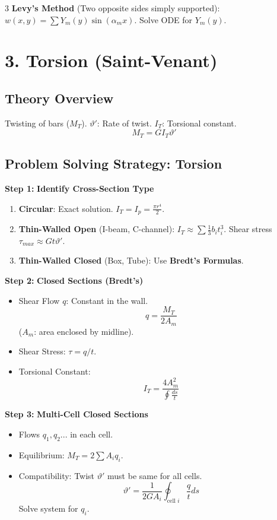 \documentclass[8pt]{extarticle}
\newcommand{\step}[1]{\textbf{\scriptsize Step #1:}}
\begin{document}
\begin{multicols*}{3}
\textbf{Levy's Method} (Two opposite sides simply supported):
$w(x,y) = \sum Y_m(y) \sin(\alpha_m x)$.
Solve ODE for $Y_m(y)$.

\section{3. Torsion (Saint-Venant)}
\subsection{Theory Overview}
Twisting of bars ($M_T$).
$\vartheta'$: Rate of twist. $I_T$: Torsional constant.
\[ M_T = G I_T \vartheta' \]

\subsection{Problem Solving Strategy: Torsion}

\step{1} \textbf{Identify Cross-Section Type}
\begin{enumerate}
    \item \textbf{Circular}: Exact solution. $I_T = I_p = \frac{\pi r^4}{2}$.
    \item \textbf{Thin-Walled Open} (I-beam, C-channel):
    $I_T \approx \sum \frac{1}{3} b_i t_i^3$.
    Shear stress $\tau_{max} \approx G t \vartheta'$.
    \item \textbf{Thin-Walled Closed} (Box, Tube):
    Use \textbf{Bredt's Formulas}.
\end{enumerate}

\step{2} \textbf{Closed Sections (Bredt's)}
\begin{itemize}
    \item Shear Flow $q$: Constant in the wall.
    \[ q = \frac{M_T}{2 A_m} \]
    ($A_m$: area enclosed by midline).
    \item Shear Stress: $\tau = q/t$.
    \item Torsional Constant:
    \[ I_T = \frac{4 A_m^2}{\oint \frac{ds}{t}} \]
\end{itemize}

\step{3} \textbf{Multi-Cell Closed Sections}
\begin{itemize}
    \item Flows $q_1, q_2...$ in each cell.
    \item Equilibrium: $M_T = 2 \sum A_i q_i$.
    \item Compatibility: Twist $\vartheta'$ must be same for all cells.
    \[ \vartheta' = \frac{1}{2G A_i} \oint_{\text{cell } i} \frac{q}{t} ds \]
    Solve system for $q_i$.
\end{itemize}


\end{multicols*}
\end{document}
